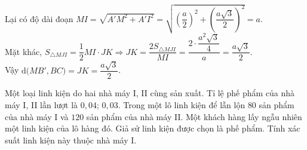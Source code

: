 \begin{ex}
{\begin{itemchoice}
\begin{eqnarray*}
\end{eqnarray*}
			Lại có độ dài đoạn $MI=\sqrt{A'M^2+A'I^2}=\sqrt{\left(\dfrac{a}{2}\right)^2+\left(\dfrac{a\sqrt{3}}{2}\right)^2}=a$.\\
			Mặt khác, $S_{\triangle MJI}=\dfrac{1}{2}MI\cdot JK\Rightarrow JK=\dfrac{2S_{\triangle MJI}}{MI}=\dfrac{2\cdot \dfrac{a^2\sqrt{3}}{4}}{a}=\dfrac{a\sqrt{3}}{2}$.\\
			Vậy $\mathrm{d}\big(MB',BC\big)=JK=\dfrac{a\sqrt{3}}{2}$.
		\end{itemchoice}
	}
\end{ex}

\caukq
\begin{ex}%
	Một loại linh kiện do hai nhà máy I, II cùng sản xuất. Tỉ lệ phế phẩm của nhà máy I, II lần lượt là $0{,}04$; $0{,}03$. Trong một lô linh kiện để lẫn lộn $80$ sản phẩm của nhà máy I và $120$ sản phẩm của nhà máy II. Một khách hàng lấy ngẫu nhiên một linh kiện của lô hàng đó. Giả sử linh kiện được chọn là phế phẩm. Tính xác suất linh kiện này thuộc nhà máy I.
\end{ex}

